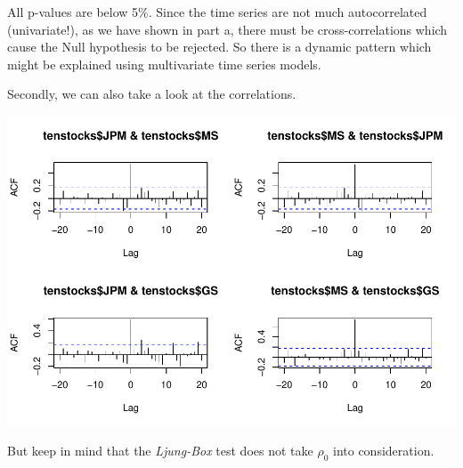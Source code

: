 \documentclass[12pt,a4paper]{article}
\newenvironment{Shaded}{\begin{snugshade}}{\end{snugshade}}
\newcommand{\DataTypeTok}[1]{\textcolor[rgb]{0.13,0.29,0.53}{#1}}
\newcommand{\DecValTok}[1]{\textcolor[rgb]{0.00,0.00,0.81}{#1}}
\newcommand{\KeywordTok}[1]{\textcolor[rgb]{0.13,0.29,0.53}{\textbf{#1}}}
\newcommand{\NormalTok}[1]{#1}
\newcommand{\OperatorTok}[1]{\textcolor[rgb]{0.81,0.36,0.00}{\textbf{#1}}}
\begin{document}
All p-values are below 5\%. Since the time series are not much
autocorrelated (univariate!), as we have shown in part a, there must be
cross-correlations which cause the Null hypothesis to be rejected. So
there is a dynamic pattern which might be explained using multivariate
time series models.

Secondly, we can also take a look at the correlations.

\begin{Shaded}
\end{Shaded}

\includegraphics{solution_exercise_1_files/figure-latex/unnamed-chunk-8-1.pdf}

But keep in mind that the \emph{Ljung-Box} test does not take \(\rho_0\)
into consideration.
\end{document}
